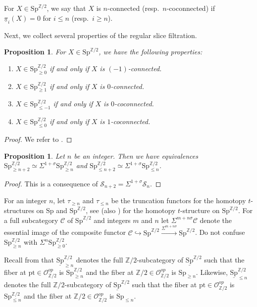 \documentclass[10pt]{amsart}
\newtheorem{prop}[thm]{Proposition}
\theoremstyle{definition}
\numberwithin{equation}{section}
\newcommand{\Z}{\mathbb{Z}}
\newcommand{\cC}{\mathcal{C}}
\newcommand{\cO}{\mathcal{O}}
\newcommand{\cS}{\mathcal{S}}
\newcommand{\ul}{\underline}
\newcommand{\pt}{\mathrm{pt}}
\newcommand{\Sp}{\mathrm{Sp}}
\begin{document}
{For $X\in \Sp^{\Z/2}$,
we say that $X$ is $n$-connected (resp.\ $n$-coconnected) if $\ul{\pi}_i(X)=0$ for $i\leq n$ (resp.\ $i\geq n$).

Next, we collect several properties of the regular slice filtration.



\begin{prop}
\label{slice.1}
For $X\in \Sp^{\Z/2}$,
we have the following properties:
\begin{enumerate}
\item[\textup{(1)}]
$X\in \Sp_{\geq 0}^{\Z/2}$ if and only if $X$ is $(-1)$-connected.
\item[\textup{(2)}]
$X\in \Sp_{\geq 1}^{\Z/2}$ if and only if $X$ is $0$-connected.
\item[\textup{(3)}]
$X\in \Sp_{\leq -1}^{\Z/2}$ if and only if $X$ is $0$-coconnected.
\item[\textup{(4)}]
$X\in \Sp_{\leq 0}^{\Z/2}$ if and only if $X$ is $1$-coconnected.
\end{enumerate}
\end{prop}
\begin{proof}
We refer to \cite[Proposition 11.1.18]{HHR21}.
\end{proof}

\begin{prop}
\label{slice.2}
Let $n$ be an integer.
Then we have equivalences $\Sp_{\geq n+2}^{\Z/2}\simeq \Sigma^{1+\sigma}\Sp_{\geq n}^{\Z/2}$ and $\Sp_{\leq n+2}^{\Z/2}\simeq \Sigma^{1+\sigma}\Sp_{\leq n}^{\Z/2}$.
\end{prop}
\begin{proof}
This is a consequence of $\cS_{n+2}=\Sigma^{1+\sigma}\cS_n$.
\end{proof}

For an integer $n$,
let $\tau_{\geq n}$ and $\tau_{\leq n}$ be the truncation functors for the homotopy $t$-structures on $\Sp$ and $\Sp^{\Z/2}$,
see \cite[\S 6]{BGS20} (also \cite[Definition 3.6]{QS22}) for the homotopy $t$-structure on $\Sp^{\Z/2}$.
For a full subcategory $\cC$ of $\Sp^{\Z/2}$ and integers $m$ and $n$
let $\Sigma^{m+n\sigma}\cC$ denote the essential image of the composite functor $\cC\hookrightarrow \Sp^{\Z/2}\xrightarrow{\Sigma^{m+n\sigma}}\Sp^{\Z/2}$.
Do not confuse $\Sp_{\geq n}^{\Z/2}$ with $\Sigma^n \Sp_{\geq 0}^{\Z/2}$.



Recall from \cite[Definition 3.11]{QS22} that $\ul{\Sp}_{\geq n}^{\Z/2}$ denotes the full $\Z/2$-subcategory of $\ul{\Sp}^{\Z/2}$ such that the fiber at $\pt\in \cO_{\Z/2}^{op}$ is $\Sp_{\geq n}^{\Z/2}$ and the fiber at $\Z/2\in \cO_{\Z/2}^{op}$ is $\Sp_{\geq n}$.
Likewise,
$\ul{\Sp}_{\leq n}^{\Z/2}$ denotes the full $\Z/2$-subcategory of $\ul{\Sp}^{\Z/2}$ such that the fiber at $\pt\in \cO_{\Z/2}^{op}$ is $\Sp_{\leq n}^{\Z/2}$ and the fiber at $\Z/2\in \cO_{\Z/2}^{op}$ is $\Sp_{\leq n}$.

}
\end{document}
